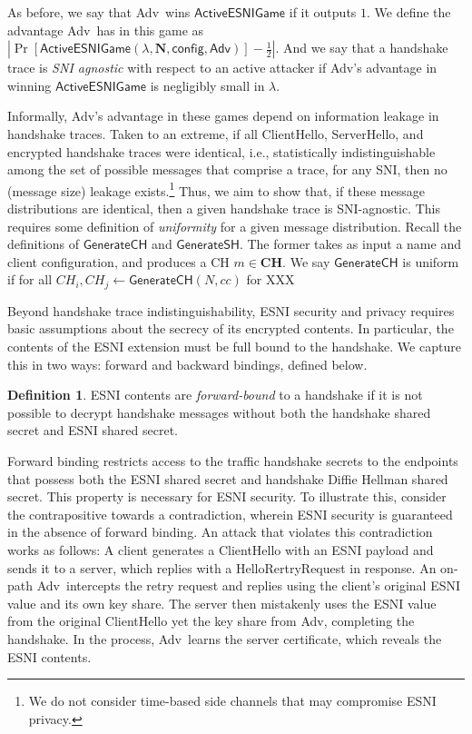 \documentclass{article}
\newcommand{\adv}{{\sf Adv}}
\newcommand{\madv}{\mathsf{Adv}}
\theoremstyle{definition}
\newtheorem{definition}{Definition}[section]
\begin{document}
As before, we say that \adv\ wins $\mathsf{ActiveESNIGame}$ if it outputs $1$. 
We define the advantage \adv\ has in this game as
$|\Pr[\mathsf{ActiveESNIGame}(\lambda, \mathbf{N}, \mathsf{config}, \madv)] - \frac{1}{2}|$. And we say that a handshake trace
is \emph{SNI agnostic} with respect to an active attacker if \adv's advantage in winning $\mathsf{ActiveESNIGame}$ is negligibly 
small in $\lambda$.

Informally, \adv's advantage in these games depend on information leakage in handshake traces. 
Taken to an extreme, if all ClientHello, ServerHello, and encrypted handshake traces were 
identical, i.e., statistically indistinguishable among the set of possible messages that comprise
a trace, for any SNI, then no (message size) leakage exists.\footnote{We do not consider time-based
side channels that may compromise ESNI privacy.} Thus, we aim to show that, if these message
distributions are identical, then a given handshake trace is SNI-agnostic. This requires some
definition of \emph{uniformity} for a given message distribution. Recall the definitions of 
$\mathsf{GenerateCH}$ and $\mathsf{GenerateSH}$. The former takes as input a name and client
configuration, and produces a CH $m \in \mathbf{CH}$. We say $\mathsf{GenerateCH}$ is uniform
if for all $CH_i, CH_j \gets \mathsf{GenerateCH}(N, cc)$ for XXX



Beyond handshake trace indistinguishability, ESNI security and privacy requires basic assumptions
about the secrecy of its encrypted contents. In particular, the contents of the ESNI extension must
be full bound to the handshake. We capture this in two ways: forward and backward bindings, defined 
below.

\begin{definition}
ESNI contents are \emph{forward-bound} to a handshake if it is not possible to decrypt handshake messages 
without both the handshake shared secret and ESNI shared secret.
\end{definition}

Forward binding restricts access to the traffic handshake secrets to the endpoints that possess both
the ESNI shared secret and handshake Diffie Hellman shared secret. This property is necessary for 
ESNI security. To illustrate this, consider the contrapositive towards a contradiction, wherein ESNI 
security is guaranteed in the absence of forward binding. An attack that violates this contradiction works 
as follows: A client generates a ClientHello with an ESNI payload and sends it to a server, which replies 
with a HelloRertryRequest in response. An on-path \adv\ intercepts the retry request and replies using
the client's original ESNI value and its own key share. The server then mistakenly uses the ESNI
value from the original ClientHello yet the key share from \adv, completing the handshake. In the
process, \adv\ learns the server certificate, which reveals the ESNI contents.
\end{document}
